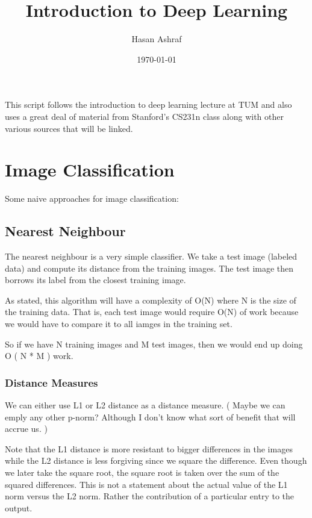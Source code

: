 \documentclass[11pt]{article}
\author{Hasan Ashraf}
\date{\today}
\title{Introduction to Deep Learning}
\begin{document}
\maketitle
\tableofcontents

This script follows the introduction to deep learning lecture at TUM and also uses a great 
deal of material from Stanford's CS231n class along with other various sources that 
will be linked. 

\section{Image Classification}
\label{sec:org910b1eb}

Some naive approaches for image classification: 

\subsection{Nearest Neighbour}
\label{sec:orgb368538}

The nearest neighbour is a very simple classifier. We take a test image (labeled data) and compute its distance from 
the training images. The test image then borrows its label from the closest training image. 

As stated, this algorithm will have a complexity of O(N) where N is the size of the training data. That is, each 
test image would require O(N) of work because we would have to compare it to all iamges in the training set. 

So if we have N training images and M test images, then we would end up doing O ( N * M ) work. 

\subsubsection{Distance Measures}
\label{sec:org8bf0a58}

We can either use L1 or L2 distance as a distance measure. ( Maybe we can emply any other p-norm? Although I don't 
know what sort of benefit that will accrue us. )

Note that the L1 distance is more resistant to bigger differences in the images while the L2 distance is less forgiving
since we square the difference. Even though we later take the square root, the square root is taken over the 
sum of the squared differences. This is not a statement about the actual value of the L1 norm versus the L2 norm. 
Rather the contribution of a particular entry to the output. 
\end{document}

